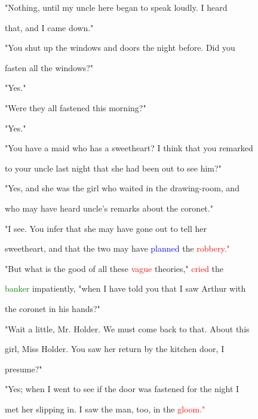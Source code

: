 "Nothing, until my uncle here began to speak loudly. I heard

 that, and I came down."



 "You shut up the windows and doors the night before. Did you

 fasten all the windows?"



 "Yes."



 "Were they all fastened this morning?"



 "Yes."



 "You have a maid who has a \textcolor{BurntOrange}{sweetheart?} I think that you remarked

 to your uncle last night that she had been out to see him?"



 "Yes, and she was the girl who \textcolor{BurntOrange}{waited} in the drawing-room, and

 who may have heard uncle's remarks about the coronet."



 "I see. You infer that she may have gone out to tell her

 \textcolor{BurntOrange}{sweetheart,} and that the two may have \textcolor{blue}{planned} the \textcolor{red}{robbery."}



 "But what is the \textcolor{BurntOrange}{good} of all these \textcolor{red}{vague} \textcolor{BurntOrange}{theories,"} \textcolor{red}{cried} the

 \textcolor{green}{banker} impatiently, "when I have told you that I saw Arthur with

 the coronet in his hands?"



 \textcolor{BurntOrange}{"Wait} a little, Mr. Holder. We must come back to that. About this

 girl, Miss Holder. You saw her return by the kitchen door, I

 presume?"



 "Yes; when I went to see if the door was fastened for the night I

 met her \textcolor{BurntOrange}{slipping} in. I saw the man, too, in the \textcolor{red}{gloom."}



